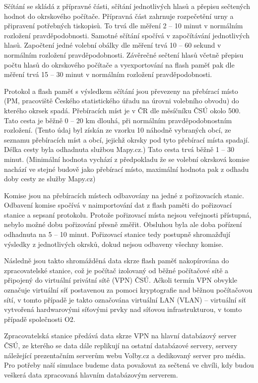 \documentclass[12pt,a4paper,titlepage,final]{article}
\begin{document}
Sčítání se skládá z přípravné části, sčítání jednotlivých hlasů a přepisu sečtených hodnot do okrskového počítače. Přípravná část zahrnuje rozpečetění urny a připravení potřebných tiskopisů. To trvá dle měření 2 -- 10 minut v normálním rozložení pravděpodobnosti. Samotné sčítání spočívá v započítávání jednotlivých hlasů. Započtení jedné volební obálky dle měření trvá 10 -- 60 sekund v normálním rozložení pravděpodobnosti. Závěrečné sečtení hlasů včetně přepisu počtu hlasů do okrskového počítače a vyexportování na flash paměť pak dle měření trvá 15 -- 30 minut v normálním rozložení pravděpodobnosti.

Protokol a flash paměť s výsledkem sčítání jsou převezeny na přebírací místo (PM, pracoviště Českého statistického úřadu na úrovni volebního obvodu) do kterého okrsek spadá. Přebíracích míst je v ČR dle měsíčníku ČSÚ okolo 500. \cite{mesicnik} Tato cesta je běžně 0 -- 20 km dlouhá, při normálním pravděpodobnostním rozložení. (Tento údaj byl získán ze vzorku 10 náhodně vybraných obcí, ze seznamu přebíracích míst a obcí, jejichž okrsky pod tyto přebírací místa spadají. Délka cesty byla odhadnuta službou Mapy.cz.) Tato cesta trvá běžně 1 -- 30 minut. (Minimální hodnota vychází z předpokladu že se volební okrsková komise nachází ve stejné budově jako přebírací místo, maximální hodnota pak z odhadu doby cesty ze služby Mapy.cz)

Komise jsou na přebíracích místech odbavovány na jedné z pořizovacích stanic. Odbavení komise spočívá v naimportování dat z flash paměti do pořizovací stanice a sepsaní protokolu. Protože pořizovací místa nejsou veřejnosti přístupná, nebylo možné dobu pořizování přesně změřit. Obsluhou byla ale doba pořízení odhadnuta na 5 -- 10 minut. Pořizovací stanice tedy postupně shromažďují výsledky z jednotlivých okrsků, dokud nejsou odbaveny všechny komise.

Následně jsou takto shromážděná data skrze flash paměť nakopírována do zpracovatelské stanice, což je počítač izolovaný od běžné počítačové sítě a připojený do virtuální privátní sítě (VPN) ČSÚ. Ačkoli termín VPN obvykle označuje virtuální síť postavenou za pomoci kryptografie nad běžnou počítačovou sítí, v tomto případě je takto označována virtuální LAN (VLAN) -- virtuální síť vytvořená hardwarovými síťovými prvky nad síťovou infrastrukturou, v tomto případě společnosti O2. \cite{smlouva-spec-web}

Zpracovatelská stanice předává data skrze VPN na hlavní databázový server ČSÚ, ze kterého se data dále replikují na ostatní databázové servery, servery náležející prezentačním serverům webu Volby.cz a dedikovaný server pro média. \cite{spec-soutez} Pro potřeby naší simulace budeme data považovat za sečtená ve chvíli, kdy budou veškerá data zpracovaná hlavním databázovým serverem.
\end{document}
